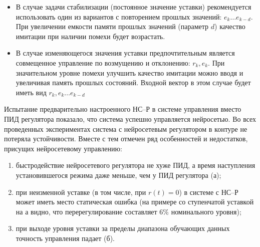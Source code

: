 \begin{itemize}
\item
В случае задачи стабилизации (постоянное значение уставки)
рекомендуется использовать один из вариантов с повторением прошлых
значений: $e_k\ldots e_{k-d}$.  При увеличении емкости памяти прошлых
значений (параметр $d$) качество имитации при наличии помехи будет
возрастать.

\item
В случае изменяющегося значения уставки предпочтительным является
совмещенное управление по возмущению и отклонению: $r_k,e_k$.  При
значительном уровне помехи улучшить качество имитации можно вводя и
увеличивая память прошлых состояний.  Входной вектор в этом случае
будет иметь вид $r_k,e_k\ldots e_{k-d}$
\end{itemize}

Испытание предварительно настроенного НС--Р в системе управления
вместо ПИД регулятора показало, что система успешно управляется
нейросетью.  Во всех проведенных экспериментах система с нейросетевым
регулятором в контуре не потеряла устойчивости.  Вместе с тем отмечен
ряд особенностей и недостатков, присущих нейросетевому управлению:

\begin{enumerate}

\item быстродействие нейросетевого регулятора не хуже ПИД, а время
наступления установившегося режима даже меньше, чем у ПИД регулятора
(а);

\item при неизменной уставке (в том числе, при $r(t)=0$) в системе
с НС--Р может иметь место статическая ошибка (на примере со
ступенчатой уставкой на а видно, что
перерегулирование составляет 6\% номинального уровня);

\item при выходе уровня уставки за пределы диапазона обучающих данных
точность управления падает (б).
\end{enumerate}

